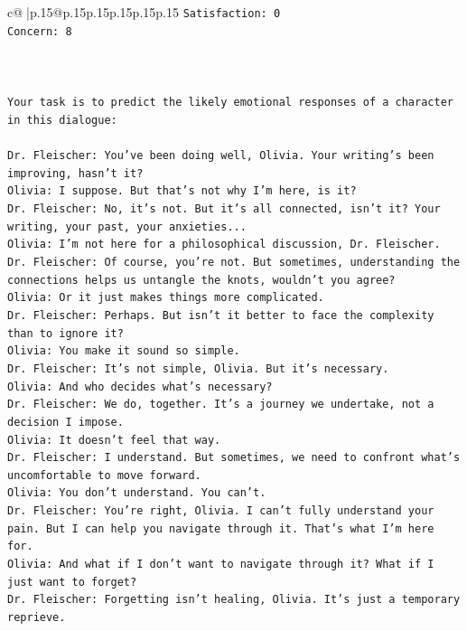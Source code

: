 \documentclass{article}
\begin{document}
{\begin{supertabular}{c@{$\;$}|p{.15\linewidth}@{}p{.15\linewidth}p{.15\linewidth}p{.15\linewidth}p{.15\linewidth}p{.15\linewidth}}
{{{\texttt{Satisfaction: 0} \\
\texttt{Concern: 8} \\
\\ 
\\ 
\\ 
\texttt{Your task is to predict the likely emotional responses of a character in this dialogue:} \\
\\ 
\texttt{Dr. Fleischer: You've been doing well, Olivia. Your writing's been improving, hasn't it?} \\
\texttt{Olivia: I suppose. But that's not why I'm here, is it?} \\
\texttt{Dr. Fleischer: No, it's not. But it's all connected, isn't it? Your writing, your past, your anxieties...} \\
\texttt{Olivia: I'm not here for a philosophical discussion, Dr. Fleischer.} \\
\texttt{Dr. Fleischer: Of course, you're not. But sometimes, understanding the connections helps us untangle the knots, wouldn't you agree?} \\
\texttt{Olivia: Or it just makes things more complicated.} \\
\texttt{Dr. Fleischer: Perhaps. But isn't it better to face the complexity than to ignore it?} \\
\texttt{Olivia: You make it sound so simple.} \\
\texttt{Dr. Fleischer: It's not simple, Olivia. But it's necessary.} \\
\texttt{Olivia: And who decides what's necessary?} \\
\texttt{Dr. Fleischer: We do, together. It's a journey we undertake, not a decision I impose.} \\
\texttt{Olivia: It doesn't feel that way.} \\
\texttt{Dr. Fleischer: I understand. But sometimes, we need to confront what's uncomfortable to move forward.} \\
\texttt{Olivia: You don't understand. You can't.} \\
\texttt{Dr. Fleischer: You're right, Olivia. I can't fully understand your pain. But I can help you navigate through it. That's what I'm here for.} \\
\texttt{Olivia: And what if I don't want to navigate through it? What if I just want to forget?} \\
\texttt{Dr. Fleischer: Forgetting isn't healing, Olivia. It's just a temporary reprieve.} \\
}}}
\end{supertabular}}
\end{document}
